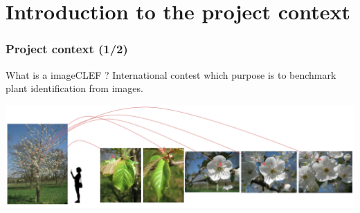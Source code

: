 \documentclass[xcolor=table]{beamer}
\begin{document}
\section{Introduction to the project context}
\begin{frame} \frametitle{Project context (1/2)}

\begin{block}{What is a imageCLEF ?}
    International contest which purpose is to benchmark plant identification from images.
\end{block}

	\includegraphics[scale=0.27]{OnePrunus.png}



\end{frame}
\end{document}
